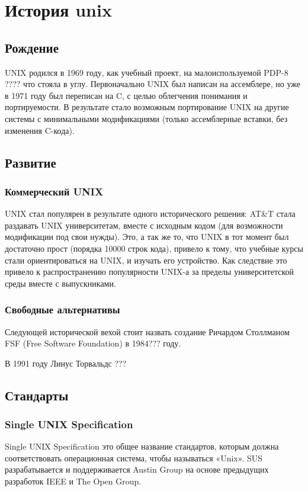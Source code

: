 \chapter {История unix}
\section {Рождение}
UNIX родился в 1969 году, как учебный проект, на малоиспользуемой PDP-8 ???? что стояла в углу.
Первоначально UNIX был написан на ассемблере, но уже в 1971 году был переписан на C, с целью облегчения понимания и портируемости. В результате стало возможным портирование UNIX на другие системы с минимальными модификациями (только ассемблерные вставки, без изменения C-кода).
\section {Развитие}
\subsection {Коммерческий UNIX}
UNIX стал популярен в результате одного исторического решения: AT\&T стала раздавать UNIX университетам, вместе с исходным кодом (для возможности модификации под свои нужды). Это, а так же то, что UNIX в тот момент был достаточно прост (порядка 10000 строк кода), привело к тому, что учебные курсы стали ориентироваться на UNIX, и изучать его устройство. Как следствие это привело к распространению популярности UNIX-а за пределы университетской среды вместе с выпускниками.
\subsection {Свободные альтернативы}
Следующей исторической вехой стоит назвать создание Ричардом Столлманом FSF (Free Software Foundation) в 1984??? году. 

В 1991 году Линус Торвальдс ???
\section {Стандарты}
\subsection {Single UNIX Specification}
Single UNIX Specification это общее название стандартов, которым должна соответствовать операционная система, чтобы называться «Unix». SUS разрабатывается и поддерживается Austin Group на основе предыдущих разработок IEEE и The Open Group.
